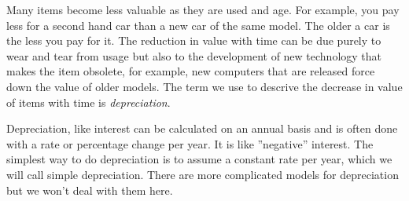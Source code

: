     \noindent
  
        \label{m39332*id71341}Many items become less valuable as they are used and age. For example, you pay less for a second hand car than a new car of the same model. The older a car is the less you pay for it. The reduction in value with time can be due purely to wear and tear from usage but also to the development of new technology that makes the item obsolete, for example, new computers that are released force down the value of older models. The term we use to descrive the decrease in value of items with time is \textsl{depreciation}.\par 
        \label{m39332*id71354}Depreciation, like interest can be calculated on an annual basis and is often done with a rate or percentage change per year. It is like ''negative'' interest. The simplest way to do depreciation is to assume a constant rate per year, which we will call simple depreciation. There are more complicated models for depreciation but we won't deal with them here.\par 
\label{m39332*secfhsst!!!underscore!!!id1613}\vspace{.5cm} 
      
